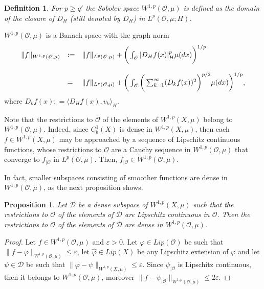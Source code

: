 \documentclass[reqno,twoside,12pt]{amsart}
\newtheorem{Definition}[Theorem]{Definition}
\newtheorem{Proposition}[Theorem]{Proposition}
\begin{document}
\begin{Definition}
For $p\geq q'$  the Sobolev space $W^{1,p}({\mathcal O}, \mu)$ is defined as the domain of the closure of $D_H$ (still denoted by $D_H$) in $L^{p}({\mathcal O}, \mu; H)$. 
\end{Definition}

$W^{1,p}({\mathcal O}, \mu)$ is a Banach space with the graph norm 
$$\begin{array}{lll}
{\displaystyle} \|f\|_{W^{1,p}({\mathcal O}, \mu)} & := &{\displaystyle}  \|f\|_{L^p({\mathcal O}, \mu)} +  \bigg( \int_{\mathcal O} |D_Hf(x)|_H^{p}\mu(dx)\bigg)^{1/p}
\\
\\
& =& {\displaystyle}   \|f\|_{L^p({\mathcal O}, \mu)} +
\bigg( \int_{\mathcal O} \bigg(\sum_{k=1}^{\infty}   (D_{k}f(x))^2\bigg)^{p/2}\mu(dx)\bigg)^{1/p} , \end{array}$$
where  $D_{k}f(x): = \langle D_Hf(x), v_k\rangle_H$. 

Note that the restrictions to ${\mathcal O}$ of the elements of $W^{1,p}(X, \mu)$ belong to $W^{1,p}({\mathcal O}, \mu)$. Indeed, since $C^1_b(X)$ is dense in $W^{1,p}(X, \mu)$, then each $f\in W^{1,p}(X, \mu)$ may be approached by a sequence of Lipschitz continuous functions, whose restrictions to ${\mathcal O}$ are a Cauchy sequence in 
$W^{1,p}({\mathcal O}, \mu)$ that converge to $f_{|{\mathcal O}}$ in $L^{p}({\mathcal O}, \mu)$. Then, $f_{|{\mathcal O}} \in W^{1,p}({\mathcal O}, \mu)$. 
 
In fact, smaller subspaces consisting of smoother functions are dense in $W^{1,p}({\mathcal O}, \mu)$, as the next proposition shows. 

\begin{Proposition}
\label{approx}
Let $\mathcal D$ be a dense subspace of  $W^{1,p}(X, \mu)$ such that the restrictions to  ${\mathcal O}$ of the elements of  $\mathcal D$ are Lipschitz continuous in ${\mathcal O}$. Then the restrictions to  ${\mathcal O}$ of the elements of  $\mathcal D$ are dense  in $W^{1,p}({\mathcal O}, \mu)$. 
\end{Proposition}
\begin{proof}
Let  $f\in W^{1,p}({\mathcal O}, \mu)$ and  ${\varepsilon} >0$. Let  $\varphi \in Lip ({\mathcal O})$ be such that  $\|f-\varphi\|_{W^{1,p}({\mathcal O}, \mu)} \leq {\varepsilon}$, let $\hat{\varphi}\in Lip (X)$ be  any Lipschitz extension of  $\varphi$ and  let $\psi\in 
 \mathcal D$ be such that 
$\| \varphi -\psi\|_{W^{1,p}(X, \mu)} \leq {\varepsilon}$. Since   $\psi_{|{\mathcal O}}$ is Lipschitz continuous, then it belongs to $W^{1,p}({\mathcal O}, \mu)$, moreover  $\| f -\psi_{|{\mathcal O}} \|_{W^{1,p}({\mathcal O}, \mu)} \leq 2{\varepsilon}$.
\end{proof}
\end{document}
